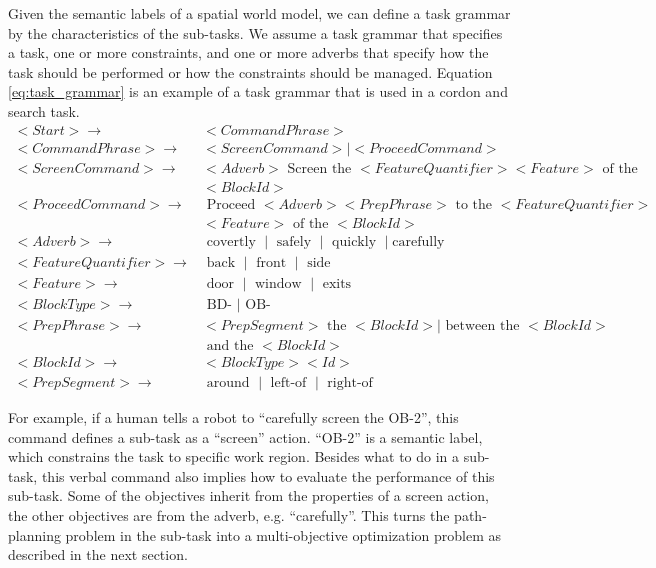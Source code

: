 Given the semantic labels of a spatial world model, we can define a task grammar by the characteristics of the sub-tasks.
We assume a task grammar that specifies a task, one or more constraints, and one or more adverbs that specify how the task should be performed or how the constraints should be managed.
Equation \ref{eq:task_grammar} is an example of a task grammar that is used in a cordon and search task.
\begin{equation}
\label{eq:task_grammar}
\begin{aligned}
< Start > \rightarrow & < CommandPhrase > \\
< CommandPhrase > \rightarrow & < ScreenCommand > \mid < ProceedCommand > \\
< ScreenCommand > \rightarrow & < Adverb > \mbox{ Screen the } < FeatureQuantifier > < Feature > \mbox{ of the } \\
& < BlockId > \\
< ProceedCommand > \rightarrow & \mbox{ Proceed } < Adverb > < PrepPhrase > \mbox{ to the } < FeatureQuantifier > \\ 
& < Feature >  \mbox{ of the } < BlockId > \\
< Adverb > \rightarrow & \mbox{ covertly } \mid \mbox{ safely } \mid \mbox{ quickly } \mid \mbox{carefully}\\
<FeatureQuantifier> \rightarrow & \mbox{ back }  \mid \mbox { front } \mid \mbox{ side } \\
<Feature> \rightarrow & \mbox{ door } \mid \mbox{ window } \mid \mbox{ exits } \\
<BlockType> \rightarrow & \mbox{ BD- } \mid \mbox{ OB- } \\
<PrepPhrase> \rightarrow & < PrepSegment > \mbox{ the } < BlockId > \mid \mbox{ between the } < BlockId > \\
& \mbox{ and the } < BlockId > \\
< BlockId > \rightarrow & < BlockType > < Id > \\
<PrepSegment> \rightarrow & \mbox{ around } \mid \mbox{ left-of } \mid \mbox{ right-of }
\end{aligned}
\end{equation}

For example, if a human tells a robot to ``carefully screen the OB-2'', this command defines a sub-task as a ``screen'' action.
``OB-2'' is a semantic label, which constrains the task to specific work region.
Besides what to do in a sub-task, this verbal command also implies how to evaluate the performance of this sub-task.
Some of the objectives inherit from the properties of a screen action,
the other objectives are from the adverb, e.g. ``carefully''.
This turns the path-planning problem in the sub-task into a multi-objective optimization problem as described in the next section.
